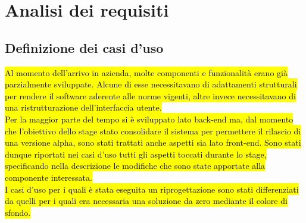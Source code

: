 \section{Analisi dei requisiti}

\subsection{Definizione dei casi d'uso}
	\hl{Al momento dell'arrivo in azienda, molte componenti e funzionalità erano già parzialmente sviluppate. Alcune di esse necessitavano di adattamenti strutturali per rendere il software aderente alle norme vigenti, altre invece necessitavano di una ristrutturazione dell'interfaccia utente. \\ 
	Per la maggior parte del tempo si è sviluppato lato back-end  ma, dal momento che l'obiettivo dello stage  stato consolidare il sistema per permettere il rilascio di una versione alpha, sono stati trattati anche aspetti sia lato front-end. 
	Sono stati dunque riportati nei casi d'uso tutti gli aspetti toccati durante lo stage,  specificando nella descrizione le modifiche che sono state apportate alla componente interessata. \\ 
	I casi  d'uso per i quali è stata eseguita un riprogettazione sono stati differenziati da quelli per i quali era necessaria una soluzione da zero mediante il colore di sfondo.}
